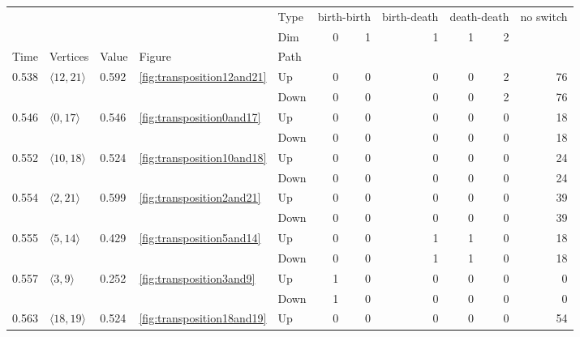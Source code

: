 \documentclass{article}
\begin{document}
\begin{center}
\begin{tabular}{lllllrrrrrr}
\toprule
 &  &  &  & Type & \multicolumn{2}{r}{birth-birth} & birth-death & \multicolumn{2}{r}{death-death} & no switch \\
 &  &  &  & Dim & 0 & 1 & 1 & 1 & 2 &  \\
Time & Vertices & Value & Figure & Path &  &  &  &  &  &  \\
\midrule
\multirow[t]{2}{*}{0.538} & \multirow[t]{2}{*}{$\langle12, 21\rangle$} & \multirow[t]{2}{*}{0.592} & \multirow[t]{2}{*}{\ref{fig:transposition12and21}} & Up & 0 & 0 & 0 & 0 & 2 & 76 \\
 &  &  &  & Down & 0 & 0 & 0 & 0 & 2 & 76 \\
\cline{1-11} \cline{2-11} \cline{3-11} \cline{4-11}
\multirow[t]{2}{*}{0.546} & \multirow[t]{2}{*}{$\langle0, 17\rangle$} & \multirow[t]{2}{*}{0.546} & \multirow[t]{2}{*}{\ref{fig:transposition0and17}} & Up & 0 & 0 & 0 & 0 & 0 & 18 \\
 &  &  &  & Down & 0 & 0 & 0 & 0 & 0 & 18 \\
\cline{1-11} \cline{2-11} \cline{3-11} \cline{4-11}
\multirow[t]{2}{*}{0.552} & \multirow[t]{2}{*}{$\langle10, 18\rangle$} & \multirow[t]{2}{*}{0.524} & \multirow[t]{2}{*}{\ref{fig:transposition10and18}} & Up & 0 & 0 & 0 & 0 & 0 & 24 \\
 &  &  &  & Down & 0 & 0 & 0 & 0 & 0 & 24 \\
\cline{1-11} \cline{2-11} \cline{3-11} \cline{4-11}
\multirow[t]{2}{*}{0.554} & \multirow[t]{2}{*}{$\langle2, 21\rangle$} & \multirow[t]{2}{*}{0.599} & \multirow[t]{2}{*}{\ref{fig:transposition2and21}} & Up & 0 & 0 & 0 & 0 & 0 & 39 \\
 &  &  &  & Down & 0 & 0 & 0 & 0 & 0 & 39 \\
\cline{1-11} \cline{2-11} \cline{3-11} \cline{4-11}
\multirow[t]{2}{*}{0.555} & \multirow[t]{2}{*}{$\langle5, 14\rangle$} & \multirow[t]{2}{*}{0.429} & \multirow[t]{2}{*}{\ref{fig:transposition5and14}} & Up & 0 & 0 & 1 & 1 & 0 & 18 \\
 &  &  &  & Down & 0 & 0 & 1 & 1 & 0 & 18 \\
\cline{1-11} \cline{2-11} \cline{3-11} \cline{4-11}
\multirow[t]{2}{*}{0.557} & \multirow[t]{2}{*}{$\langle3, 9\rangle$} & \multirow[t]{2}{*}{0.252} & \multirow[t]{2}{*}{\ref{fig:transposition3and9}} & Up & 1 & 0 & 0 & 0 & 0 & 0 \\
 &  &  &  & Down & 1 & 0 & 0 & 0 & 0 & 0 \\
\cline{1-11} \cline{2-11} \cline{3-11} \cline{4-11}
\multirow[t]{2}{*}{0.563} & \multirow[t]{2}{*}{$\langle18, 19\rangle$} & \multirow[t]{2}{*}{0.524} & \multirow[t]{2}{*}{\ref{fig:transposition18and19}} & Up & 0 & 0 & 0 & 0 & 0 & 54 \\

\end{tabular}
\end{center}
\end{document}
